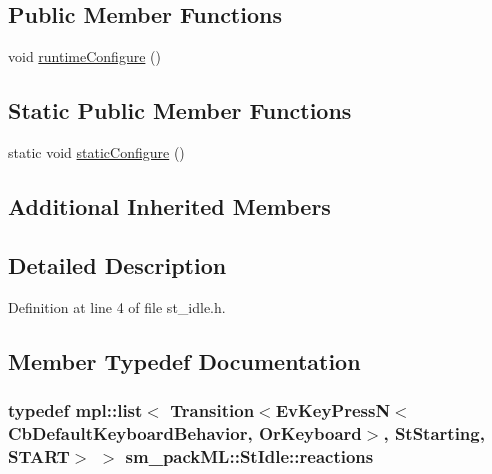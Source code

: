 \subsection*{Public Member Functions}
\begin{DoxyCompactItemize}
\item 
void \hyperlink{structsm__packML_1_1StIdle_a4b0427716c4054b1345876384066473e}{runtime\+Configure} ()
\end{DoxyCompactItemize}
\subsection*{Static Public Member Functions}
\begin{DoxyCompactItemize}
\item 
static void \hyperlink{structsm__packML_1_1StIdle_a946ecb6d3aeee4886ea37640ec630385}{static\+Configure} ()
\end{DoxyCompactItemize}
\subsection*{Additional Inherited Members}


\subsection{Detailed Description}


Definition at line 4 of file st\+\_\+idle.\+h.



\subsection{Member Typedef Documentation}
\subsubsection[{\texorpdfstring{reactions}{reactions}}]{\setlength{\rightskip}{0pt plus 5cm}typedef mpl\+::list$<$ Transition$<$Ev\+Key\+PressN$<$Cb\+Default\+Keyboard\+Behavior, {\bf Or\+Keyboard}$>$, {\bf St\+Starting}, {\bf S\+T\+A\+RT}$>$ $>$ {\bf sm\+\_\+pack\+M\+L\+::\+St\+Idle\+::reactions}}\hypertarget{structsm__packML_1_1StIdle_aaa2867c5d09625334cfd937ddacc4f07}{}\label{structsm__packML_1_1StIdle_aaa2867c5d09625334cfd937ddacc4f07}


